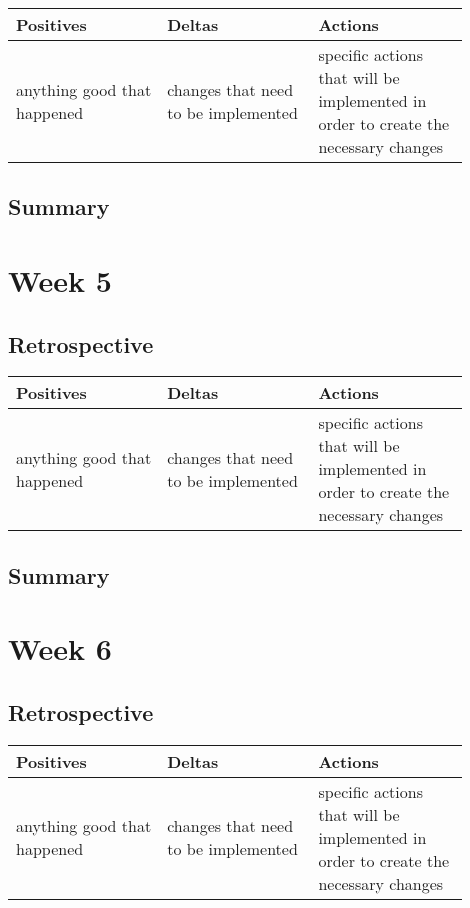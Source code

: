 \documentclass[letterpaper,10pt,serif,draftclsnofoot,onecolumn,compsoc,titlepage]{IEEEtran}
\begin{document}
\begin{tabular}{|p{0.3\linewidth}|p{0.3\linewidth}|p{0.3\linewidth}|}
   \hline
   \textbf{Positives} & \textbf{Deltas} & \textbf{Actions}\\ 
   \hline
   anything good that happened & changes that need to be implemented & specific actions that will be implemented in order to create the necessary changes \\
   \hline
\end{tabular}

\subsection{Summary}

\section{Week 5}
\subsection{Retrospective}


\begin{tabular}{|p{0.3\linewidth}|p{0.3\linewidth}|p{0.3\linewidth}|}
   \hline
   \textbf{Positives} & \textbf{Deltas} & \textbf{Actions}\\ 
   \hline
   anything good that happened & changes that need to be implemented & specific actions that will be implemented in order to create the necessary changes \\
   \hline
\end{tabular}

\subsection{Summary}

\section{Week 6}
\subsection{Retrospective}


\begin{tabular}{|p{0.3\linewidth}|p{0.3\linewidth}|p{0.3\linewidth}|}
   \hline
   \textbf{Positives} & \textbf{Deltas} & \textbf{Actions}\\ 
   \hline
   anything good that happened & changes that need to be implemented & specific actions that will be implemented in order to create the necessary changes \\
   \hline
\end{tabular}
\end{document}
